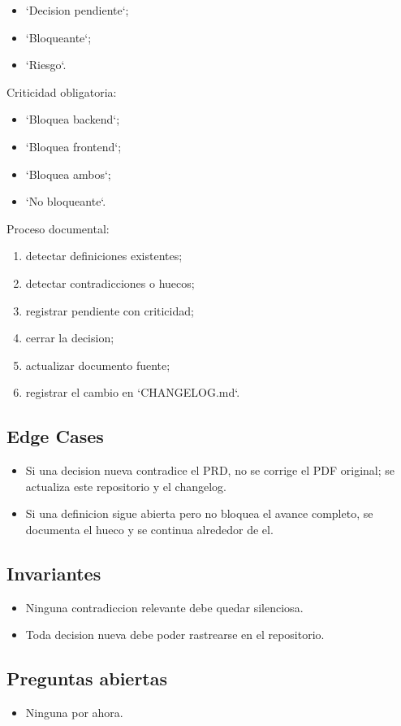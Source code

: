 \begin{itemize}
  \item `Decision pendiente`;
  \item `Bloqueante`;
  \item `Riesgo`.
\end{itemize}

Criticidad obligatoria:

\begin{itemize}
  \item `Bloquea backend`;
  \item `Bloquea frontend`;
  \item `Bloquea ambos`;
  \item `No bloqueante`.
\end{itemize}

Proceso documental:

\begin{enumerate}
  \item detectar definiciones existentes;
  \item detectar contradicciones o huecos;
  \item registrar pendiente con criticidad;
  \item cerrar la decision;
  \item actualizar documento fuente;
  \item registrar el cambio en `CHANGELOG.md`.
\end{enumerate}

\subsection{Edge Cases}

\begin{itemize}
  \item Si una decision nueva contradice el PRD, no se corrige el PDF original; se actualiza este repositorio y el changelog.
  \item Si una definicion sigue abierta pero no bloquea el avance completo, se documenta el hueco y se continua alrededor de el.
\end{itemize}

\subsection{Invariantes}

\begin{itemize}
  \item Ninguna contradiccion relevante debe quedar silenciosa.
  \item Toda decision nueva debe poder rastrearse en el repositorio.
\end{itemize}

\subsection{Preguntas abiertas}

\begin{itemize}
  \item Ninguna por ahora.
\end{itemize}

